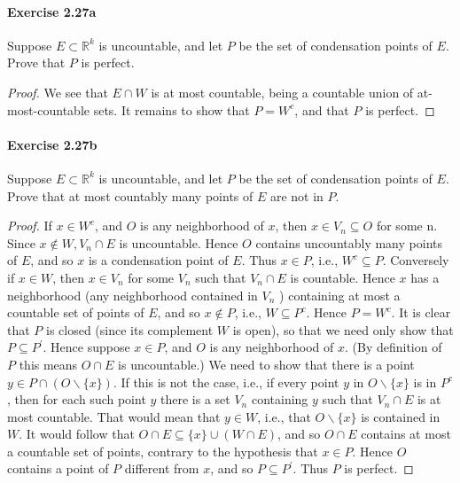 \documentclass{article}
\theoremstyle{definition}
\begin{document}
\paragraph{Exercise 2.27a} Suppose $E\subset\mathbb{R}^k$ is uncountable, and let $P$ be the set of condensation points of $E$. Prove that $P$ is perfect.
\begin{proof}
    We see that $E \cap W$ is at most countable, being a countable union of at-most-countable sets. It remains to show that $P=W^c$, and that $P$ is perfect.
\end{proof}



\paragraph{Exercise 2.27b} Suppose $E\subset\mathbb{R}^k$ is uncountable, and let $P$ be the set of condensation points of $E$. Prove that at most countably many points of $E$ are not in $P$.
\begin{proof}
    If $x \in W^c$, and $O$ is any neighborhood of $x$, then $x \in V_n \subseteq O$ for some n. Since $x \notin W, V_n \cap E$ is uncountable. Hence $O$ contains uncountably many points of $E$, and so $x$ is a condensation point of $E$. Thus $x \in P$, i.e., $W^c \subseteq P$.
Conversely if $x \in W$, then $x \in V_n$ for some $V_n$ such that $V_n \cap E$ is countable. Hence $x$ has a neighborhood (any neighborhood contained in $V_n$ ) containing at most a countable set of points of $E$, and so $x \notin P$, i.e., $W \subseteq P^c$. Hence $P=W^c$.
It is clear that $P$ is closed (since its complement $W$ is open), so that we need only show that $P \subseteq P^{\prime}$. Hence suppose $x \in P$, and $O$ is any neighborhood of $x$. (By definition of $P$ this means $O \cap E$ is uncountable.) We need to show that there is a point $y \in P \cap(O \backslash\{x\})$. If this is not the case, i.e., if every point $y$ in $O \backslash\{x\}$ is in $P^c$, then for each such point $y$ there is a set $V_n$ containing $y$ such that $V_n \cap E$ is at most countable. That would mean that $y \in W$, i.e., that $O \backslash\{x\}$ is contained in $W$. It would follow that $O \cap E \subseteq\{x\} \cup(W \cap E)$, and so $O \cap E$ contains at most a countable set of points, contrary to the hypothesis that $x \in P$. Hence $O$ contains a point of $P$ different from $x$, and so $P \subseteq P^{\prime}$. Thus $P$ is perfect.
\end{proof}
\end{document}

